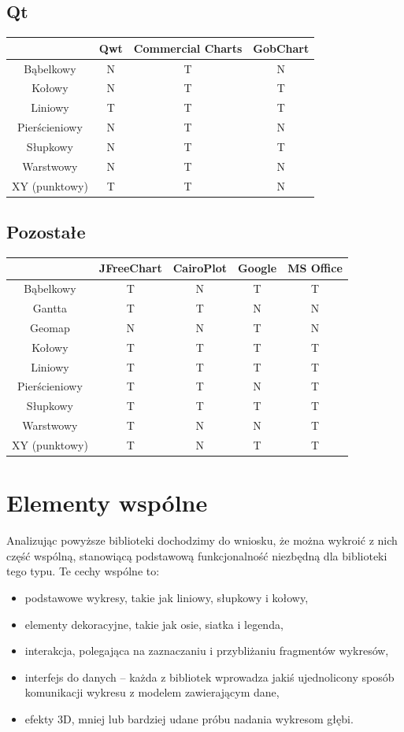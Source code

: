 \documentclass[11pt,twoside,a4paper,final]{llncs}
\begin{document}
\subsection{Qt}
\begin{tabular}{|c|c|c|c|}
\hline
&  Qwt & Commercial Charts & GobChart\\
\hline
Bąbelkowy & N & T & N\\
\hline
Kołowy & N & T & T\\
\hline
Liniowy & T & T & T\\
\hline
Pierścieniowy & N & T & N\\
\hline
Słupkowy & N & T & T\\
\hline
Warstwowy & N & T & N\\
\hline
XY (punktowy) & T & T & N\\
\hline
\end{tabular}

\subsection{Pozostałe}
\begin{tabular}{|c|c|c|c|c|}
\hline
& JFreeChart & CairoPlot & Google & MS Office\\
\hline
Bąbelkowy & T & N & T & T\\
\hline
Gantta & T & T & N & N\\
\hline
Geomap & N & N & T & N\\
\hline
Kołowy & T & T & T & T\\
\hline
Liniowy & T & T & T & T\\
\hline
Pierścieniowy & T & T & N & T\\
\hline
Słupkowy & T & T & T & T\\
\hline
Warstwowy & T & N & N & T\\
\hline
XY (punktowy) & T & N & T & T\\
\hline
\end{tabular}

\section{Elementy wspólne}
Analizując powyższe biblioteki dochodzimy do wniosku, że można wykroić z nich część wspólną, stanowiącą podstawową funkcjonalność niezbędną dla biblioteki tego typu. Te cechy wspólne to:
\begin{itemize}
\item{podstawowe wykresy, takie jak liniowy, słupkowy i kołowy,}
\item{elementy dekoracyjne, takie jak osie, siatka i legenda,}
\item{interakcja, polegająca na zaznaczaniu i przybliżaniu fragmentów wykresów,}
\item{interfejs do danych -- każda z bibliotek wprowadza jakiś ujednolicony sposób komunikacji wykresu z modelem zawierającym dane,}
\item{efekty 3D, mniej lub bardziej udane próbu nadania wykresom głębi.}
\end{itemize}
\end{document}
